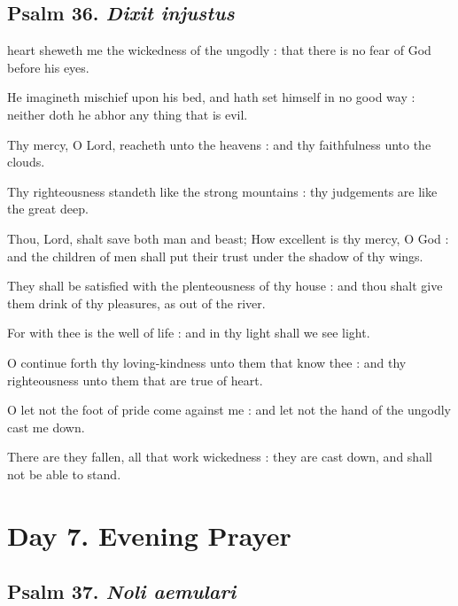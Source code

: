 \subsection{Psalm 36. \textit{Dixit injustus}}

 heart sheweth me the wickedness of the ungodly : that there is no fear of God before his eyes.\par
{}
He imagineth mischief upon his bed, and hath set himself in no good way : neither doth he abhor any thing that is evil.\par
{}Thy mercy, O Lord, reacheth unto the heavens : and thy faithfulness unto the clouds.\par
{}Thy righteousness standeth like the strong mountains : thy judgements are like the great deep.\par
{}Thou, Lord, shalt save both man and beast; How excellent is thy mercy, O God : and the children of men shall put their trust under the shadow of thy wings.\par
{}They shall be satisfied with the plenteousness of thy house : and thou shalt give them drink of thy pleasures, as out of the river.\par
{}For with thee is the well of life : and in thy light shall we see light.\par
{}O continue forth thy loving-kindness unto them that know thee : and thy righteousness unto them that are true of heart.\par
{}O let not the foot of pride come against me : and let not the hand of the ungodly cast me down.\par
{}There are they fallen, all that work wickedness : they are cast down, and shall not be able to stand.\par

\section*{Day 7. Evening Prayer}

\subsection{Psalm 37. \textit{Noli aemulari}}

